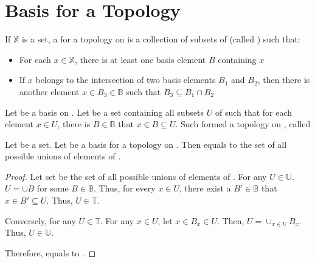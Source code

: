 \section{Basis for a Topology}

      \begin{definition}[basis]
            If $ \mathbb{X} $ is a set, a  for a topology on  is a collection  of subsets of  (called ) such that:
            \begin{itemize}
                  \item For each $ x \in \mathbb{X} $, there is at least one basis element $ B $ containing $ x $
                  \item If $ x $ belongs to the intersection of two basis elements $ B_{1} $ and $ B_{2} $, then there is another element $ x \in B_{3} \in \mathbb{B} $ such that $ B_{3} \subseteq B_{1} \cap B_{2} $
            \end{itemize}
      \end{definition}

      \begin{definition}
            Let  be a basis on . Let  be a set containing all subsets $ U $ of  such that for each element $ x \in U $, there is $ B \in \mathbb{B} $ that $ x \in B \subseteq U $.
            Such  formed a topology on , called 
      \end{definition}
      
      \begin{lemma}
            Let  be a set. Let  be a basis for a topology  on . Then  equals to the set of all possible unions of elements of .
      \end{lemma}

      \begin{proof}
            Let set  be the set of all possible unions of elements of . For any $ U \in \mathbb{U} $. $ U = \cup B $  for some $ B \in \mathbb{B} $. Thus, for every $ x \in U $, there exist a $ B' \in \mathbb{B} $ that $ x \in B' \subseteq U $. Thus, $ U \in \mathbb{T} $.

            Conversely, for any $ U \in \mathbb{T} $. For any $ x \in U $, let $ x \in B_{x} \in U $. Then, $ U = \cup_{x \in U}B_{x} $. Thus, $ U \in \mathbb{U} $.

            Therefore,  equals to .
      \end{proof}

